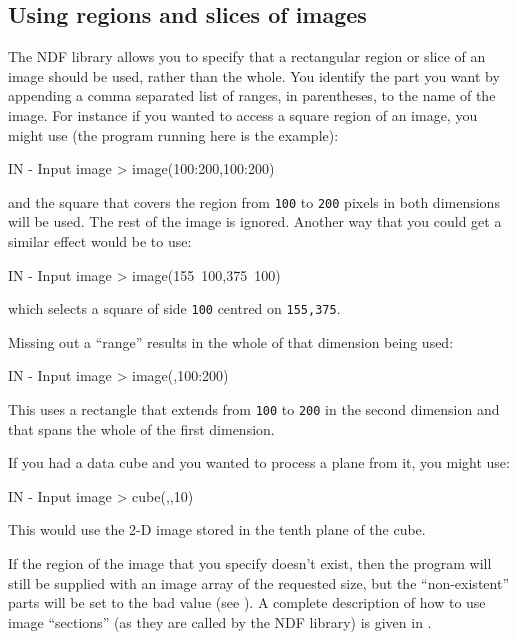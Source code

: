 \documentclass[twoside,11pt,nolof]{starlink}
\providecommand{\myverb}[1]{{\texttt{#1}}}
\newenvironment{code}{\begin{small}}
                     {\end{small}}
\begin{document}
\subsection{Using \label{IMGREGIONS}regions and slices of images}
The NDF library allows you to specify that a rectangular region or
slice of an image should be used, rather than the whole. You identify
the part you want by appending a comma separated list of ranges, in
parentheses, to the name of the image.  For instance if you wanted to
access a square region of an image, you might use (the program running
here is the \htmlref{\myverb{mean}}{IMGMEAN} example):
\begin{code}
\begin{terminalv}
IN - Input image > image(100:200,100:200)
\end{terminalv}
\end{code}
and the square that covers the region from \myverb{100} to
\myverb{200} pixels in both dimensions will be used. The rest of the image is
ignored. Another way that you could get a similar effect would be to
use:
\begin{code}
\begin{terminalv}
   IN - Input image > image(155~100,375~100)
\end{terminalv}
\end{code}
which selects a square of side \myverb{100} centred on
\myverb{155,375}.

Missing out a ``range'' results in the whole of that dimension being
used:
\begin{code}
\begin{terminalv}
   IN - Input image > image(,100:200)
\end{terminalv}
\end{code}
This uses a rectangle that extends from \myverb{100} to \myverb{200} in the
second dimension and that spans the whole of the first dimension.

If you had a data cube and you wanted to process a plane from it,
you might use:
\begin{code}
\begin{terminalv}
   IN - Input image > cube(,,10)
\end{terminalv}
\end{code}
This would use the 2-D image stored in the tenth plane of the cube.

If the region of the image that you specify doesn't exist, then the
program will still be supplied with an image array of the requested
size, but the ``non-existent'' parts will be set to the bad value (see
).  A complete description of
how to use image ``sections'' (as they are called by the NDF library)
is given in .
\end{document}
